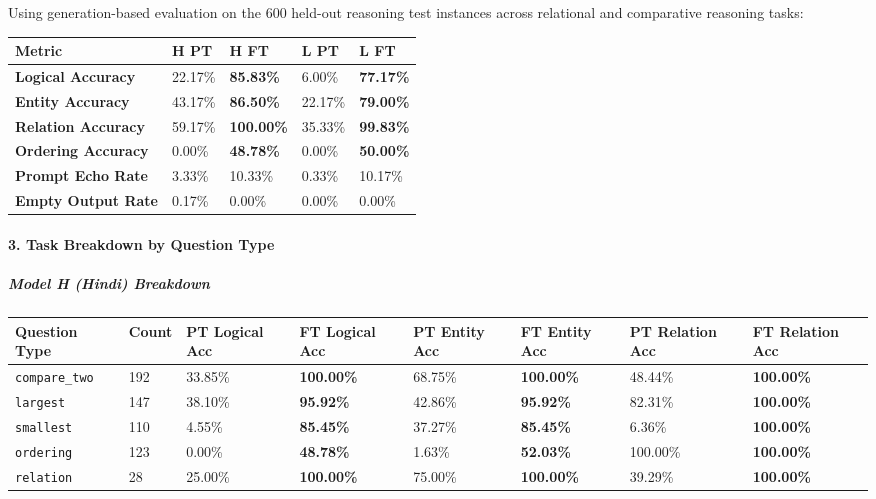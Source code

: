\documentclass[10pt,a4paper]{article}
\begin{document}
Using generation-based evaluation on the 600 held-out reasoning test instances across relational and comparative reasoning tasks:

\begin{center}
\small
\begin{longtable}{l l l l l}
\toprule
Metric & H PT & H FT & L PT & L FT \\
\midrule
\endhead
\textbf{Logical Accuracy} & 22.17\% & \textbf{85.83\%} & 6.00\% & \textbf{77.17\%} \\
\textbf{Entity Accuracy} & 43.17\% & \textbf{86.50\%} & 22.17\% & \textbf{79.00\%} \\
\textbf{Relation Accuracy} & 59.17\% & \textbf{100.00\%} & 35.33\% & \textbf{99.83\%} \\
\textbf{Ordering Accuracy} & 0.00\% & \textbf{48.78\%} & 0.00\% & \textbf{50.00\%} \\
\textbf{Prompt Echo Rate} & 3.33\% & 10.33\% & 0.33\% & 10.17\% \\
\textbf{Empty Output Rate} & 0.17\% & 0.00\% & 0.00\% & 0.00\% \\
\bottomrule
\end{longtable}
\end{center}

\paragraph{3. Task Breakdown by Question Type}

\subparagraph{Model H (Hindi) Breakdown}
\begin{center}
\small
\begin{longtable}{l l l l l l l l}
\toprule
Question Type & Count & PT Logical Acc & FT Logical Acc & PT Entity Acc & FT Entity Acc & PT Relation Acc & FT Relation Acc \\
\midrule
\endhead
\texttt{compare\_two} & 192 & 33.85\% & \textbf{100.00\%} & 68.75\% & \textbf{100.00\%} & 48.44\% & \textbf{100.00\%} \\
\texttt{largest} & 147 & 38.10\% & \textbf{95.92\%} & 42.86\% & \textbf{95.92\%} & 82.31\% & \textbf{100.00\%} \\
\texttt{smallest} & 110 & 4.55\% & \textbf{85.45\%} & 37.27\% & \textbf{85.45\%} & 6.36\% & \textbf{100.00\%} \\
\texttt{ordering} & 123 & 0.00\% & \textbf{48.78\%} & 1.63\% & \textbf{52.03\%} & 100.00\% & \textbf{100.00\%} \\
\texttt{relation} & 28 & 25.00\% & \textbf{100.00\%} & 75.00\% & \textbf{100.00\%} & 39.29\% & \textbf{100.00\%} \\
\bottomrule
\end{longtable}
\end{center}
\end{document}
